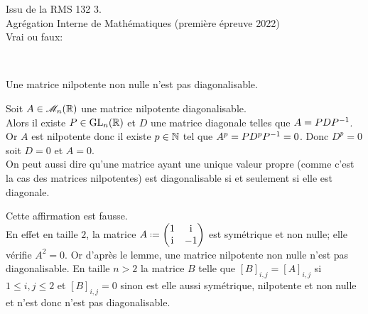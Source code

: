 \begin{exercice}
    Issu de la RMS 132 3. \\
    Agrégation Interne de Mathématiques (première épreuve 2022) \\
    Vrai ou faux: 
\end{exercice}

\begin{solution}\\

    \begin{lemme}
        Une matrice nilpotente non nulle n'est pas diagonalisable.
    \end{lemme}
    
    \begin{preuve}
        Soit $A \in \mathscr{M}_n(\mathbb{R})$ une matrice nilpotente diagonalisable. \\
        Alors il existe $P \in \mathrm{GL}_n(\mathbb{R})$ et $D$ une matrice diagonale telles que $A = PDP^{-1}$. Or $A$ est nilpotente donc il existe $p \in \mathbb{N}$ tel que $A^p = P D^p P^{-1} = 0$. Donc $D^p = 0$ soit $D = 0$ et $A = 0$. \\
        On peut aussi dire qu'une matrice ayant une unique valeur propre (comme c'est la cas des matrices nilpotentes) est diagonalisable si et seulement si elle est diagonale.
    \end{preuve}
    Cette affirmation est fausse. \\
    En effet en taille $2$, la matrice $A \defeq \begin{pmatrix}
        1 & \mi \\
        \mi & -1
    \end{pmatrix}$ est symétrique et non nulle; elle vérifie $A^2 = 0$. Or d'après le lemme, une matrice nilpotente non nulle n'est pas diagonalisable. En taille $n > 2$ la matrice $B$ telle que $[B]_{i,j} = [A]_{i,j}$ si $1 \leqslant i, j \leqslant 2$ et $[B]_{i,j} = 0$ sinon est elle aussi symétrique, nilpotente et non nulle et n'est donc n'est pas diagonalisable. 
\end{solution}   

